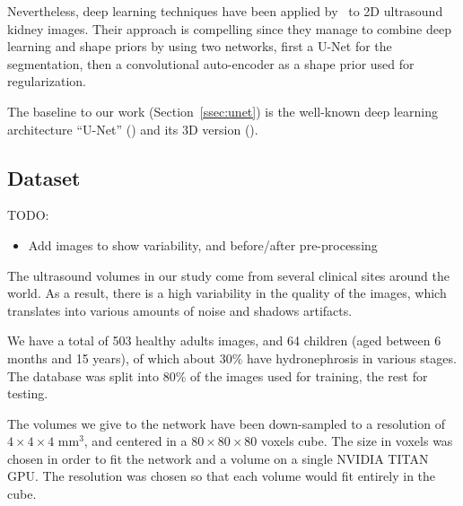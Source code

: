 Nevertheless, deep learning techniques have been applied by~\textcite{ravishankar2017MICCAI} to 2D ultrasound kidney images. Their approach is compelling since they manage to combine deep learning and shape priors by using two networks, first a U-Net for the segmentation, then a convolutional auto-encoder as a shape prior used for regularization.

The baseline to our work (Section~\ref{ssec:unet}) is the well-known deep learning architecture ``U-Net'' (\textcite{ronneberger2015MICCAI}) and its 3D version (\textcite{cicek2016MICCAI}). 


\subsection{Dataset}
\label{ssec:data}

TODO:
\begin{itemize}
    \item Add images to show variability, and before/after pre-processing
\end{itemize}

The ultrasound volumes in our study come from several clinical sites around the world. As a result, there is a high variability in the quality of the images, which translates into various amounts of noise and shadows artifacts.

We have a total of 503 healthy adults images, and 64 children (aged between 6 months and 15 years), of which about $30 \%$ have hydronephrosis in various stages. The database was split into $80 \%$ of the images used for training, the rest for testing.

The volumes we give to the network have been down-sampled to a resolution of $4 \times 4 \times 4$ mm$^3$, and centered in a $80 \times 80 \times 80$ voxels cube. The size in voxels was chosen in order to fit the network and a volume on a single NVIDIA TITAN GPU. The resolution was chosen so that each volume would fit entirely in the cube. 

